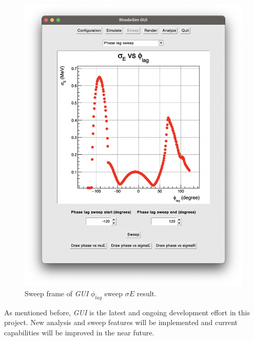 \documentclass{book}
\begin{document}
\begin{figure}[h]
    \centering
    \includegraphics[width=0.85\linewidth]{../../../figures/rhodoSim/GUI_sweep_sE_3.png}
    \caption{Sweep frame of \textit{GUI} $\phi_{lag}$ sweep $\sigma E$ result.}
    \label{fig:gui_sweep_sE}
    \vspace{10pt}
\end{figure}

As mentioned before, \textit{GUI} is the latest and ongoing development effort in this project.
New analysis and sweep features will be implemented and current capabilities will be improved in the near future.

\end{document}
